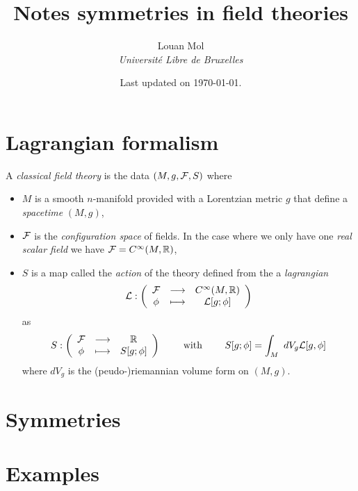 \documentclass[a4paper,10pt]{article}
\title{\vspace{-2cm}\textbf{Notes symmetries in field theories}}
\author{Louan Mol\\ \textit{Université Libre de Bruxelles}}
\date{Last updated on \today.}
\begin{document}
\maketitle

\section{Lagrangian formalism}

    A \emph{classical field theory} is the data $(M,g,\mathcal{F},S)$ where
    \begin{itemize}
        \item $M$ is a smooth $n$-manifold provided with a Lorentzian metric $g$ that define a \emph{spacetime} $(M,g)$,
        \item $\mathcal{F}$ is the \emph{configuration space} of fields. In the case where we only have one \emph{real scalar field} we have $\mathcal{F}= C^\infty(M,\mathbb{R})$,
        \item $S$ is a map called the \emph{action} of the theory defined from the a \emph{lagrangian}
        \begin{equation}
            \mathcal{L}:\left(
            \begin{array}{ccc}
                \mathcal{F} & \longrightarrow & C^\infty(M,\mathbb{R}) \\
                \phi & \longmapsto & \mathcal{L}[g;\phi]
            \end{array}
            \right)
        \end{equation}
        as
        \begin{equation}
            S:\left(
            \begin{array}{ccc}
                \mathcal{F} & \longrightarrow & \mathbb{R} \\
                \phi & \longmapsto & S[g;\phi]
            \end{array}
            \right)\qquad\text{ with }\qquad S[g;\phi]=\int_M~dV_g\mathcal{L}[g,\phi]
        \end{equation}
        where $dV_g$ is the (peudo-)riemannian volume form on $(M,g)$.
    \end{itemize}


\section{Symmetries}

\section{Examples}
\end{document}
